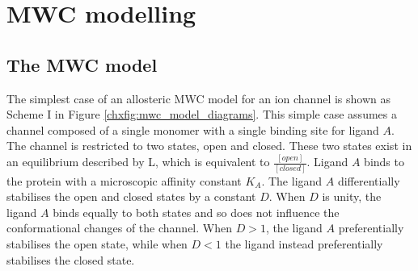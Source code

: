 \chapter{\label{ch:x}MWC modelling} 

\graphicspath{{figures/chx/}}

\minitoc


\section{The MWC model}

The simplest case of an allosteric MWC model for an ion channel is shown as Scheme I in Figure \ref{chxfig:mwc_model_diagrams}.
This simple case assumes a channel composed of a single monomer with a single binding site for ligand $A$.
The channel is restricted to two states, open and closed.
These two states exist in an equilibrium described by L, which is equivalent to $\frac{[open]}{[closed]}$.
Ligand $A$ binds to the protein with a microscopic affinity constant $K_A$.
The ligand $A$ differentially stabilises the open and closed states by a constant $D$.
When $D$ is unity, the ligand $A$ binds equally to both states and so does not influence the conformational changes of the channel.
When $D>1$, the ligand $A$ preferentially stabilises the open state, while when $D<1$ the ligand instead preferentially stabilises the closed state.


